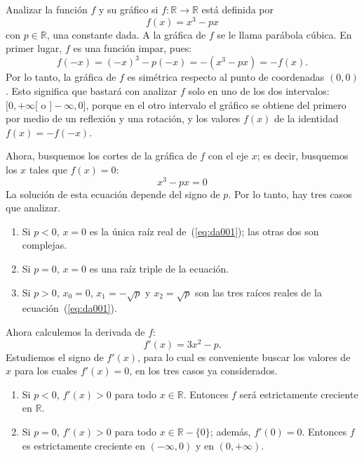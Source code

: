 \begin{exemplo}[Solución]{%
Analizar la función $f$ y su gráfico si $f\colon\mathbb{R}\to \mathbb{R}$ está definida por
\[
f(x) = x^3-px
\]
con $p\in \mathbb{R}$, una constante dada. A la gráfica de $f$ se le llama parábola cúbica.
}%
En primer lugar, $f$ es una función impar, pues:
\begin{equation*}
    f(-x)=(- x)^3-p(-x)=-(x^3-px)=-f(x).
\end{equation*}
Por lo tanto, la gráfica de $f$ es simétrica respecto al punto de coordenadas $(0,0)$. Esto
significa que bastará con analizar $f$ solo en uno de los dos intervalos: $[0,+\infty[$ o
$]-\infty,0]$, porque en el otro intervalo el gráfico se obtiene del primero por medio de un
reflexión y una rotación, y los valores $f(x)$ de la identidad $f(x) = -f(-x)$.

Ahora, busquemos los cortes de la gráfica de $f$ con el eje $x$; es decir, busquemos los $x$ tales
que $f(x)=0$:
\begin{equation}
\label{eq:da001}
   x^3-px=0
\end{equation}
La solución de esta ecuación depende del signo de $p$. Por lo tanto, hay tres casos que analizar.

\begin{enumerate}
\item  Si $p<0$, $x=0$ es la única raíz real de~(\ref{eq:da001}); las otras dos son complejas.
\item  Si $p=0$, $x=0$ es una raíz triple de la ecuación.
\item  Si $p>0$, $x_0=0$, $x_1=-\sqrt{p}$ y $x_2=\sqrt{p}$ son las tres raíces reales de la
    ecuación~(\ref{eq:da001}).
\end{enumerate}

Ahora calculemos la derivada de $f$:
\begin{equation}
\label{eq:da002}
    f'(x)= 3x^2-p.
\end{equation}
Estudiemos el signo de $f'(x)$, para lo cual es conveniente buscar los valores de $x$ para los
cuales $f'(x)=0$, en los tres casos ya considerados.

\begin{enumerate}
\item Si $p<0$, $f'(x)>0$ para todo $x\in \mathbb{R}$. Entonces $f$ será estrictamente
    creciente en $\mathbb{R}$.

\item Si $p=0$, $f'(x)>0$  para todo $x\in \mathbb{R} - \{0\}$; además, $f'(0)=0$. Entonces $f$
    es estrictamente creciente en $(-\infty,0)$ y en $(0,+\infty)$.


\end{enumerate}
\end{exemplo}
